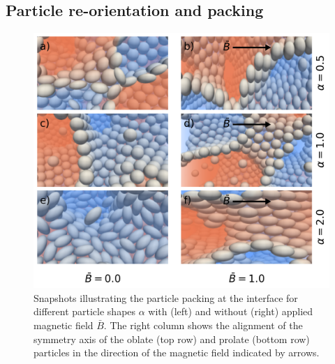 
\subsection{Particle re-orientation and packing}

\begin{figure}
    \centering
    \includegraphics[width=0.5\columnwidth]{figures/results/paper1/particle_packing_viz.png}
    \caption{Snapshots illustrating the particle packing at the interface for different particle shapes $\alpha$ with (left) 
            and without (right) applied magnetic field $\bar{B}$. The right column shows the alignment of the symmetry axis of 
            the oblate (top row) and prolate (bottom row) particles in the direction of the magnetic field indicated by arrows.}
    \label{fig:packing_viz}
\end{figure}


